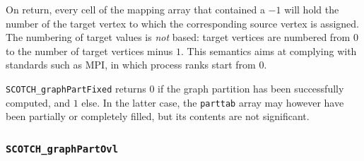 \begin{itemize}
On return, every cell of the mapping array that contained a $-1$ will
hold the number of the target vertex to which the corresponding source
vertex is assigned. The numbering of target values is {\em not\/}
based: target vertices are numbered from $0$ to the number of target
vertices minus $1$. This semantics aims at complying with standards
such as MPI, in which process ranks start from $0$.

\progret

{\tt SCOTCH\_graphPartFixed} returns $0$ if the graph partition
has been successfully computed, and $1$ else. In the latter case, the
{\tt parttab} array may however have been partially or completely
filled, but its contents are not significant.
\end{itemize}

\subsubsection{{\tt SCOTCH\_graphPartOvl}}
\label{sec-lib-func-graphpartovl}

